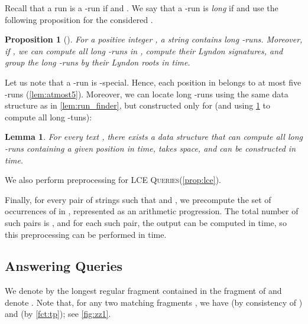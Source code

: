 \documentclass[a4paper]{article}
\newtheorem{lemma}[theorem]{Lemma}
\newtheorem{proposition}[theorem]{Proposition}
\theoremstyle{definition}
\theoremstyle{remark}
\newcommand{\LCEQ}{\textsc{LCE Queries}\xspace}
\begin{document}
Recall that a run  is a -run if  and .
We say that a -run  is \emph{long} if  and use the following proposition for the considered .

\begin{proposition}[{\cite[Section 6.1.2]{Kempa2019}}]\label{prp:taurons}
For a positive integer , a string  contains  long -runs.
Moreover, if , we can compute all long -runs in
, compute their Lyndon signatures, and group the long -runs by their Lyndon roots in  time.
\end{proposition}

Let us note that a -run is -special.
Hence, each position in  belongs to at most five -runs (\cref{lem:atmost5}).
Moreover, we can locate long -runs using the same data structure as in \cref{lem:run_finder}, but constructed only for
 (and using \cref{prp:taurons} to compute all long -tuns):
\begin{lemma}\label{lem:run_finder2}
  For every text , there exists a data structure that can compute all long -runs containing a given position in  time,
  takes  space, and can be constructed in  time.
\end{lemma}

\noindent
We also perform preprocessing for \LCEQ (\cref{prop:lce}).

Finally, for every pair  of strings such that  and , we precompute
the set of occurrences of  in , represented as an arithmetic progression.
The total number of such pairs  is , and for each such pair,
the output can be computed in  time, so this preprocessing can be performed
in  time.


\subsection{Answering Queries} 
We denote by  the longest regular fragment 
contained in the fragment  of  and denote  .
Note that, for any two matching fragments , we have  (by consistency of )
and  (by \cref{fct:tp}); see \cref{fig:zz1}.
\end{document}
